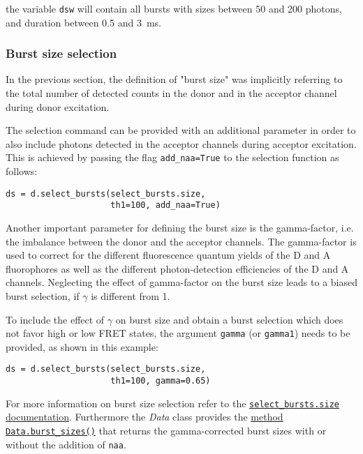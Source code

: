 the variable \verb|dsw| will contain all bursts with sizes between 50 and
200 photons, and duration between 0.5 and 3~ms.

\subsubsection{Burst size selection}

In the previous section, the definition of "burst size" was implicitly referring
to the total number of detected counts in the donor and in the acceptor channel
during donor excitation.

The selection command can be provided with an additional parameter in order to
also include photons detected in the acceptor channels during acceptor excitation.
This is achieved by passing the flag \verb|add_naa=True| to the selection function
as follows:

\begin{verbatim}
ds = d.select_bursts(select_bursts.size,
                     th1=100, add_naa=True)
\end{verbatim}

Another important parameter for defining the burst size is the gamma-factor, i.e.
the imbalance between the donor and the acceptor channels. The gamma-factor is
used to correct for the different fluorescence quantum yields of the D and A
fluorophores as well as the different photon-detection efficiencies of the D and A channels.
Neglecting the effect of gamma-factor on the burst size leads to a biased burst
selection, if $\gamma$ is different from 1.

To include the effect of $\gamma$ on burst size and obtain a burst
selection which does not favor high or low FRET states,
the argument \verb|gamma| (or \verb|gamma1|) needs to be provided,
as shown in this example:

\begin{verbatim}
ds = d.select_bursts(select_bursts.size,
                     th1=100, gamma=0.65)
\end{verbatim}

For more information on burst size selection refer to the
\href{http://fretbursts.readthedocs.org/en/latest/burst_selection.html#fretbursts.select\_bursts.size}{\texttt{select\_bursts.size} documentation}. Furthermore the \textit{Data} class provides the
\href{http://fretbursts.readthedocs.org/en/latest/data_class.html#fretbursts.burstlib.Data.burst_sizes}{method \texttt{Data.burst\_sizes()}} that returns the gamma-corrected burst sizes with or
without the addition of \verb|naa|.


